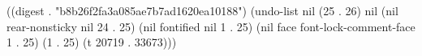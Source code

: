 
((digest . "b8b26f2fa3a085ae7b7ad1620ea10188") (undo-list nil (25 . 26) nil (nil rear-nonsticky nil 24 . 25) (nil fontified nil 1 . 25) (nil face font-lock-comment-face 1 . 25) (1 . 25) (t 20719 . 33673)))
